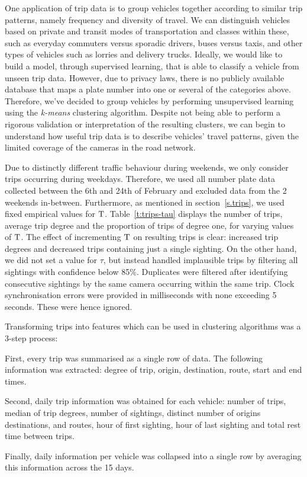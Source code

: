 One application of trip data is to group vehicles together according to similar trip patterns, namely frequency and diversity of travel. We can distinguish vehicles based on private and transit modes of transportation and classes within these, such as everyday commuters versus sporadic drivers, buses versus taxis, and other types of vehicles such as lorries and delivery trucks. Ideally, we would like to build a model, through supervised learning, that is able to classify a vehicle from unseen trip data. However, due to privacy laws, there is no publicly available database that maps a plate number into one or several of the categories above. Therefore, we've decided to group vehicles by performing unsupervised learning using the \emph{k-means} clustering algorithm. Despite not being able to perform a rigorous validation or interpretation of the resulting clusters, we can begin to understand how useful trip data is to describe vehicles' travel patterns, given the limited coverage of the cameras in the road network.

Due to distinctly different traffic behaviour during weekends, we only consider trips occurring during weekdays. Therefore, we used all number plate data collected between the 6th and 24th of February and excluded data from the 2 weekends in-between. Furthermore, as mentioned in section~\ref{s.trips}, we used fixed empirical values for $\mathrm{T}$. Table~\ref{t:trips-tau} displays the number of trips, average trip degree and the proportion of trips of degree one, for varying values of $\mathrm{T}$. The effect of incrementing $\mathrm{T}$ on resulting trips is clear: increased trip degrees and decreased trips containing just a single sighting. On the other hand, we did not set a value for $\tau$, but instead handled implausible trips by filtering all sightings with confidence below 85\%. Duplicates were filtered after identifying consecutive sightings by the same camera occurring within the same trip. Clock synchronisation errors were provided in milliseconds with none exceeding 5 seconds. These were hence ignored.

Transforming trips into features which can be used in clustering algorithms was a 3-step process:
\begin{enumerate*}[label=(\roman*)]
  \item First, every trip was summarised as a single row of data. The following information was extracted: degree of trip, origin, destination, route, start and end times.
  \item Second, daily trip information was obtained for each vehicle: number of trips, median of trip degrees, number of sightings, distinct number of origins destinations, and routes, hour of first sighting, hour of last sighting and total rest time between trips.
  \item Finally, daily information per vehicle was collapsed into a single row by averaging this information across the 15 days.
\end{enumerate*}

